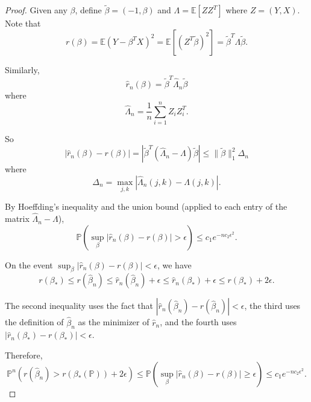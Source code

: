   \begin{proof}
    Given any $\beta$, define $\tilde{\beta} = (-1, \beta)$ and $\Lambda = \mathbb{E}[ZZ^T]$ where $Z = (Y, X)$. Note that
    \begin{equation}
     r(\beta) = \mathbb{E}(Y - \beta^T X)^2 = \mathbb{E}[(Z^T \tilde{\beta})^2] = \tilde{\beta}^T \Lambda \tilde{\beta}.
    \end{equation}

    Similarly,
    \begin{equation}
     \hat{r}_n(\beta) = \tilde{\beta}^T \hat{\Lambda}_n \tilde{\beta}
    \end{equation}
    where
    \begin{equation}
     \hat{\Lambda}_n = \frac{1}{n} \sum_{i=1}^n Z_i Z_i^T.
    \end{equation}

    So
    \begin{equation}
     |\hat{r}_n(\beta) - r(\beta)| = |\tilde{\beta}^T (\hat{\Lambda}_n - \Lambda) \tilde{\beta}| \leq \|\tilde{\beta}\|_1^2 \Delta_n
    \end{equation}
    where
    \begin{equation}
     \Delta_n = \max_{j,k} |\hat{\Lambda}_n(j,k) - \Lambda(j,k)|.
    \end{equation}

    By Hoeffding's inequality and the union bound (applied to each entry of the matrix $\hat{\Lambda}_n - \Lambda$),
    \begin{equation}
     \mathbb{P}\left(\sup_{\beta} |\hat{r}_n(\beta) - r(\beta)| > \epsilon\right) \leq c_1 e^{-n c_2 \epsilon^2}.
    \end{equation}

    On the event $\sup_{\beta} |\hat{r}_n(\beta) - r(\beta)| < \epsilon$, we have
    \begin{equation}
     r(\beta_\ast) \leq r(\hat{\beta}_n) \leq \hat{r}_n(\hat{\beta}_n) + \epsilon \leq \hat{r}_n(\beta_\ast) + \epsilon \leq r(\beta_\ast) + 2\epsilon.
    \end{equation}

    The second inequality uses the fact that $|\hat{r}_n(\hat{\beta}_n) - r(\hat{\beta}_n)| < \epsilon$, the third uses the definition of $\hat{\beta}_n$ as the minimizer of $\hat{r}_n$, and the fourth uses $|\hat{r}_n(\beta_\ast) - r(\beta_\ast)| < \epsilon$.

    Therefore,
    \begin{equation}
     \mathbb{P}^n(r(\hat{\beta}_n) > r(\beta_\ast(\mathbb{P})) + 2\epsilon) \leq \mathbb{P}\left(\sup_{\beta} |\hat{r}_n(\beta) - r(\beta)| \geq \epsilon\right) \leq c_1 e^{-n c_2 \epsilon^2}.
    \end{equation}


\end{proof}
